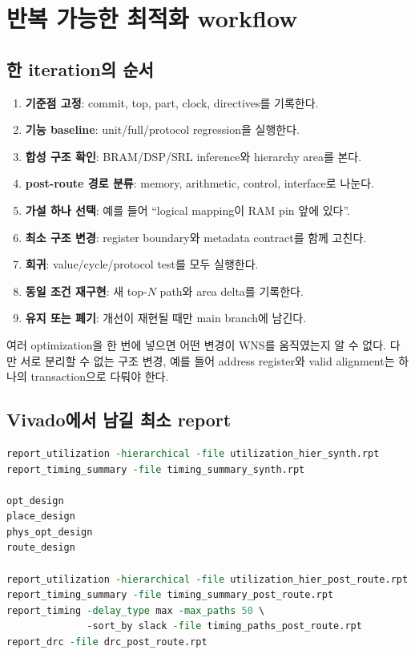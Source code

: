 \chapter{반복 가능한 최적화 workflow}

\section{한 iteration의 순서}

\begin{enumerate}
  \item \textbf{기준점 고정}: commit, top, part, clock, directives를 기록한다.
  \item \textbf{기능 baseline}: unit/full/protocol regression을 실행한다.
  \item \textbf{합성 구조 확인}: BRAM/DSP/SRL inference와 hierarchy area를 본다.
  \item \textbf{post-route 경로 분류}: memory, arithmetic, control, interface로 나눈다.
  \item \textbf{가설 하나 선택}: 예를 들어 ``logical mapping이 RAM pin 앞에 있다''.
  \item \textbf{최소 구조 변경}: register boundary와 metadata contract를 함께 고친다.
  \item \textbf{회귀}: value/cycle/protocol test를 모두 실행한다.
  \item \textbf{동일 조건 재구현}: 새 top-$N$ path와 area delta를 기록한다.
  \item \textbf{유지 또는 폐기}: 개선이 재현될 때만 main branch에 남긴다.
\end{enumerate}

여러 optimization을 한 번에 넣으면 어떤 변경이 WNS를 움직였는지 알 수 없다.
다만 서로 분리할 수 없는 구조 변경, 예를 들어 address register와 valid alignment는
하나의 transaction으로 다뤄야 한다.

\section{Vivado에서 남길 최소 report}

\begin{lstlisting}[language=tcl,numbers=none]
report_utilization -hierarchical -file utilization_hier_synth.rpt
report_timing_summary -file timing_summary_synth.rpt

opt_design
place_design
phys_opt_design
route_design

report_utilization -hierarchical -file utilization_hier_post_route.rpt
report_timing_summary -file timing_summary_post_route.rpt
report_timing -delay_type max -max_paths 50 \
              -sort_by slack -file timing_paths_post_route.rpt
report_drc -file drc_post_route.rpt
\end{lstlisting}

